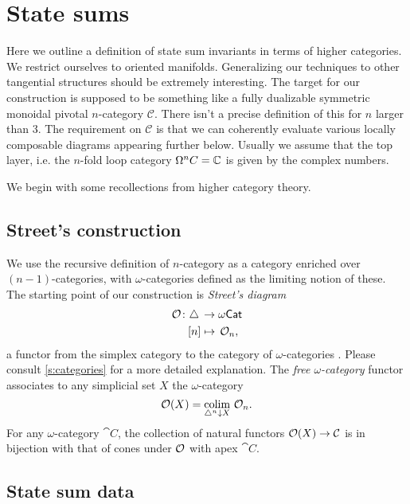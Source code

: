 
\section{State sums}

Here we outline a definition of state sum invariants in terms of higher categories.
We restrict ourselves to oriented manifolds.
Generalizing our techniques to other tangential structures should be extremely interesting.
The target for our construction is supposed to be something like a fully dualizable symmetric monoidal pivotal $n$-category $\mathcal{C}$. 
There isn't a precise definition of this for $n$ larger than 3. The requirement on $\mathcal{C}$ is that we can coherently evaluate various locally composable diagrams appearing further below. 
Usually we assume that the top layer, i.e.
the $n$-fold loop category $\Omega^nC = \mathbb{C} $ is given by the complex numbers.

We begin with some recollections from higher category theory.

\subsection{Street's construction}

We use the recursive definition of $n$-category as a category enriched over $(n-1)$-categories, with $\omega$-categories defined as the limiting notion of these.
The starting point of our construction is \textit{Street's diagram}
\[
\begin{split}
	\mathcal{O} \colon \triangle \, &\to \omega\mathsf{Cat} \\
	[n] &\mapsto \, \mathcal{O}_n,
\end{split}
\]
a functor from the simplex category to the category of $\omega$-categories \cite{street1987orientals}.
Please consult \cref{s:categories} for a more detailed explanation.
The \textit{free $\omega$-category} functor associates to any simplicial set $X$ the $\omega$-category
\[
\mathcal{O}(X) = \operatorname*{colim}_{\triangle^n \downarrow X} \, \mathcal{O}_n.
\]
For any $\omega$-category $\cat{C}$, the collection of natural functors $\mathcal{O}(X) \to \mathcal{C}$ is in bijection with that of cones under $\mathcal{O}$ with apex $\cat{C}$.

\subsection{State sum data}

